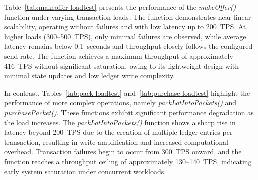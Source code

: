 \documentclass[12pt]{article}
\begin{document}
	
	Table~\ref{tab:makeoffer-loadtest} presents the performance of the \textit{makeOffer()} function under varying transaction loads. The function demonstrates near-linear scalability, operating without failures and with low latency up to 200~TPS. At higher loads (300--500~TPS), only minimal failures are observed, while average latency remains below 0.1~seconds and throughput closely follows the configured send rate. The function achieves a maximum throughput of approximately 416~TPS without significant saturation, owing to its lightweight design with minimal state updates and low ledger write complexity.
	
	
	
	
	
	\begin{table}[h]
		\centering
		\caption{Performance Results for \texttt{makeOffer} (Payload: 41 bytes) under Varying Load}
		
		
		\label{tab:makeoffer-loadtest}
	\end{table}
	
	In contrast, Tables~\ref{tab:pack-loadtest} and~\ref{tab:purchase-loadtest} highlight the performance of more complex operations, namely \textit{packLotIntoPackets()} and \textit{purchasePacket()}. These functions exhibit significant performance degradation as the load increases. The \textit{packLotIntoPackets()} function shows a sharp rise in latency beyond 200~TPS due to the creation of multiple ledger entries per transaction, resulting in write amplification and increased computational overhead. Transaction failures begin to occur from 300~TPS onward, and the function reaches a throughput ceiling of approximately 130--140~TPS, indicating early system saturation under concurrent workloads.
	
\end{document}
